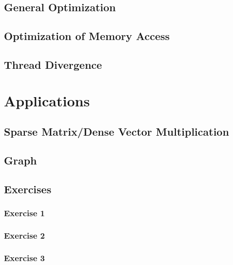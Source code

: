 \documentclass[12px,oz]{report}
\theoremstyle{indented}
\theoremstyle{indented}
\begin{document}
\section{General Optimization}
\label{sec-general-opti}


\section{Optimization of Memory Access}
\label{sec-opti-memory}


\section{Thread Divergence}
\label{sec-thread-div}


\chapter{Applications}
\label{ch-app}

	
	\section{Sparse Matrix/Dense Vector Multiplication}
	\label{sec-matrix}
	
	
	\section{Graph}
	\label{sec-graph}
	
	
	\section{Exercises}
	
		\subsection{Exercise 1}
		\subsection{Exercise 2}
		
		\subsection{Exercise 3}
		
		
\end{document}
